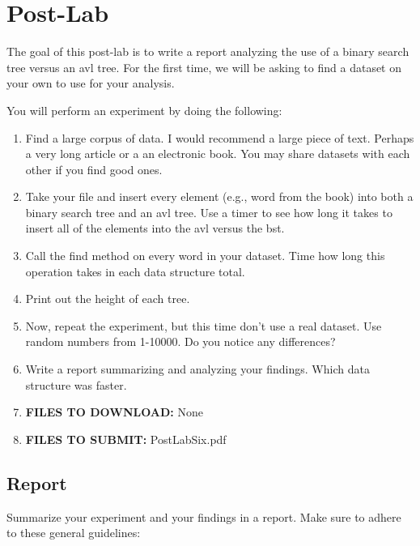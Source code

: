 \documentclass[paper=a4, fontsize=11pt, parskip=full]{scrartcl} %
\numberwithin{equation}{section} %
\numberwithin{figure}{section} %
\numberwithin{table}{section} %
\begin{document}
\newpage
\section{Post-Lab}

The goal of this post-lab is to write a report analyzing the use of a binary search tree versus an avl tree. For the first time, we will be asking to find a dataset on your own to use for your analysis. 

You will perform an experiment by doing the following:

\begin{enumerate}
	\item Find a large corpus of data. I would recommend a large piece of text. Perhaps a very long article or a an electronic book. You may share datasets with each other if you find good ones.
	\item Take your file and insert every element (e.g., word from the book) into both a binary search tree and an avl tree. Use a timer to see how long it takes to insert all of the elements into the avl versus the bst.
	\item Call the find method on every word in your dataset. Time how long this operation takes in each data structure total.
	\item Print out the height of each tree.
	\item Now, repeat the experiment, but this time don't use a real dataset. Use random numbers from 1-10000. Do you notice any differences?
	\item Write a report summarizing and analyzing your findings. Which data structure was faster.
	\item \textbf{FILES TO DOWNLOAD:} None
	\item \textbf{FILES TO SUBMIT:} PostLabSix.pdf
\end{enumerate}

\subsection{Report}

Summarize your experiment and your findings in a report. Make sure to adhere to these general guidelines:
\end{document}
